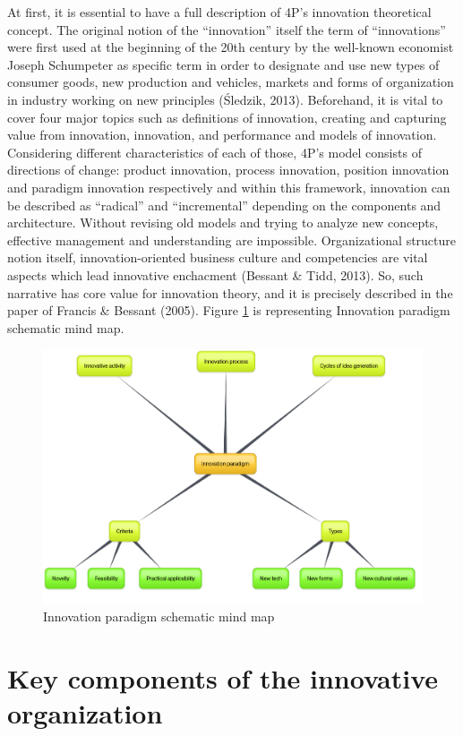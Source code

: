 \documentclass[12pt,twoside]{reedthesis}
\begin{document}
At first, it is essential to have a full description of 4P's innovation theoretical concept. The original notion of the ``innovation'' itself the term of ``innovations'' were first used at the beginning of the 20th century by the well-known economist Joseph Schumpeter as specific term in order to designate and use new types of consumer goods, new production and vehicles, markets and forms of organization in industry working on new principles (Śledzik, 2013). Beforehand, it is vital to cover four major topics such as definitions of innovation, creating and capturing value from innovation, innovation, and performance and models of innovation. Considering different characteristics of each of those, 4P's model consists of directions of change: product innovation, process innovation, position innovation and paradigm innovation respectively and within this framework, innovation can be described as ``radical'' and ``incremental'' depending on the components and architecture. Without revising old models and trying to analyze new concepts, effective management and understanding are impossible. Organizational structure notion itself, innovation-oriented business culture and competencies are vital aspects which lead innovative enchacment (Bessant \& Tidd, 2013). So, such narrative has core value for innovation theory, and it is precisely described in the paper of Francis \& Bessant (2005).
Figure \ref{fig:mindmap} is representing Innovation paradigm schematic mind map.
\begin{figure}[h]

{\centering \includegraphics[width=0.8\linewidth,]{figure/1} 

}

\caption{Innovation paradigm schematic mind map}\label{fig:mindmap}
\end{figure}
\hypertarget{key-components-of-the-innovative-organization}{%
\section{Key components of the innovative organization}\label{key-components-of-the-innovative-organization}}
\end{document}
